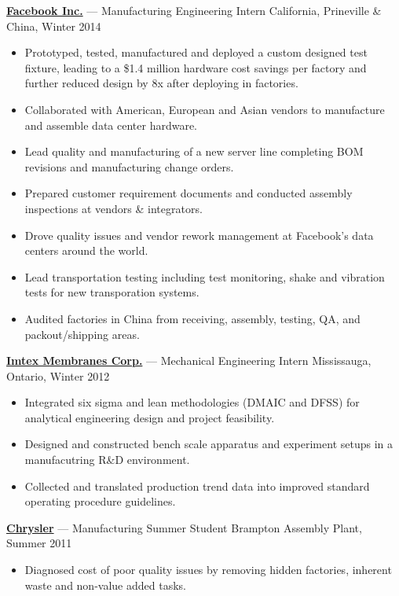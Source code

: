 \documentclass[pdftex,11pt,letterpaper]{article}
\begin{document}
\href{http://facebook.com}{\textbf{Facebook Inc.}} --- Manufacturing Engineering Intern \hfill {\color{gray} California, Prineville \& China, Winter 2014}
\begin{itemize}

\item Prototyped, tested, manufactured and deployed a custom designed test fixture, leading to a \$1.4 million hardware cost savings per factory and further reduced design by 8x after deploying in factories.
\item Collaborated with American, European and Asian vendors to manufacture and assemble data center hardware.
\item Lead quality and manufacturing of a new server line completing BOM revisions and manufacturing change orders.
\item Prepared customer requirement documents and conducted assembly inspections at vendors \& integrators.
\item Drove quality issues and vendor rework management at Facebook's data centers around the world.
\item Lead transportation testing including test monitoring, shake and vibration tests for new transporation systems.
\item Audited factories in China from receiving, assembly, testing, QA, and packout/shipping areas.
\end{itemize}

\href{http://www.imtexmembranes.com/}{\textbf{Imtex Membranes Corp.}} --- Mechanical Engineering Intern \hfill {\color{gray} Mississauga, Ontario, Winter 2012}
\begin{itemize}
\item Integrated six sigma and lean methodologies (DMAIC and DFSS) for analytical engineering design and project feasibility.
\item Designed and constructed bench scale apparatus and experiment setups in a manufacutring R\&D environment.
\item Collected and translated production trend data into improved standard operating procedure guidelines.

\end{itemize}

\href{http://chrysler.ca}{\textbf{Chrysler}} --- Manufacturing Summer Student \hfill {\color{gray} Brampton Assembly Plant, Summer 2011}
\begin{itemize}
\item Diagnosed cost of poor quality issues by removing hidden factories, inherent waste and non-value added tasks.
\end{itemize}
\end{document}
